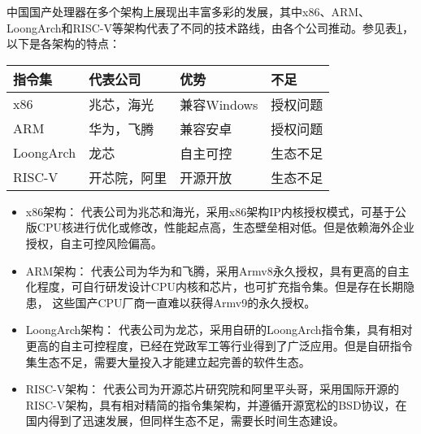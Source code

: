 中国国产处理器在多个架构上展现出丰富多彩的发展，其中x86、ARM、LoongArch\cite{LoongArch2023}和RISC-V等架构代表了不同的技术路线，由各个公司推动。参见表\ref{tab:CPUs}，以下是各架构的特点：

\begin{table}[!htbp]
\label{tab:CPUs}
\centering
\footnotesize%
\setlength{\tabcolsep}{4pt}%
\renewcommand{\arraystretch}{1.2}%
    \begin{tabular}{llll}
    \hline
    指令集       & 代表公司   & 优势        & 不足         \\ \hline
    x86       & 兆芯，海光  & 兼容Windows & 授权问题 \\
    ARM       & 华为，飞腾  & 兼容安卓      & 授权问题       \\
    LoongArch & 龙芯     & 自主可控      & 生态不足       \\
    RISC-V     & 开芯院，阿里 & 开源开放      & 生态不足    \\ \hline  
    \end{tabular}
\end{table}


    \begin{itemize}
    \item {x86架构： } 代表公司为兆芯和海光，采用x86架构IP内核授权模式，可基于公版CPU核进行优化或修改，性能起点高，生态壁垒相对低。但是依赖海外企业授权，自主可控风险偏高。
    
    \item{ARM架构：} 代表公司为华为和飞腾，采用Armv8永久授权，具有更高的自主化程度，可自行研发设计CPU内核和芯片，也可扩充指令集。但是存在长期隐患，
    这些国产CPU厂商一直难以获得Armv9的永久授权。
    
    \item{LoongArch架构：} 代表公司为龙芯，采用自研的LoongArch指令集，具有相对更高的自主可控程度，已经在党政军工等行业得到了广泛应用。但是自研指令集生态不足，需要大量投入才能建立起完善的软件生态。
    
    \item{RISC-V架构：} 代表公司为开源芯片研究院和阿里平头哥，采用国际开源的RISC-V架构，具有相对精简的指令集架构，并遵循开源宽松的BSD协议，在国内得到了迅速发展，但同样生态不足，需要长时间生态建设。
    \end{itemize}

